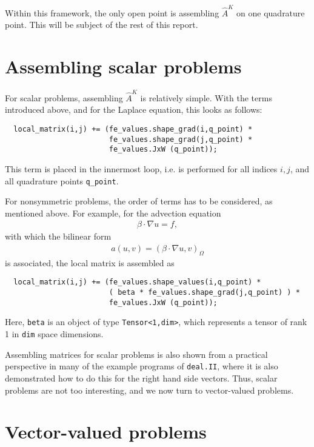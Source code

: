 \documentclass{article}
\begin{document}
Within this framework, the only open point is assembling $\hat A^K$ on one
quadrature point. This will be subject of the rest of this report.


\section{Assembling scalar problems}

For scalar problems, assembling $\hat A^K$ is relatively simple. With the
terms introduced above, and for the Laplace equation, this looks as follows:
\begin{verbatim}
  local_matrix(i,j) += (fe_values.shape_grad(i,q_point) *
                        fe_values.shape_grad(j,q_point) *
                        fe_values.JxW (q_point));
\end{verbatim}
This term is placed in the innermost loop, i.e. is performed for all indices
$i,j$, and all quadrature points \texttt{q\_point}.

For nonsymmetric problems, the order of terms has to be considered, as
mentioned above. For example, for the advection equation
\begin{gather*}
  \beta \cdot \nabla u = f,
\end{gather*}
with which the bilinear form
\begin{gather*}
  a(u,v) = (\beta \cdot \nabla u, v)_\Omega
\end{gather*}
is associated, the local matrix is assembled as
\begin{verbatim}
  local_matrix(i,j) += (fe_values.shape_values(i,q_point) *
                        ( beta * fe_values.shape_grad(j,q_point) ) *
                        fe_values.JxW (q_point));
\end{verbatim}
Here, \texttt{beta} is an object of type \texttt{Tensor<1,dim>}, which
represents a tensor of rank 1 in \texttt{dim} space dimensions.

Assembling matrices for scalar problems is also shown from a practical
perspective in many of the example programs of \texttt{deal.II}, where it is
also demonstrated how to do this for the right hand side vectors. Thus, scalar
problems are not too interesting, and we now turn to vector-valued problems.



\section{Vector-valued problems}
\end{document}
